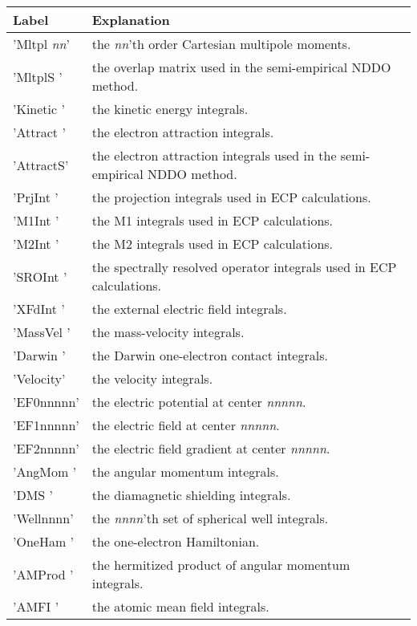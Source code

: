\begin{tabular}{ll}
\hline \hline
Label & Explanation \\
\hline
'Mltpl {\it nn}' & the {\it nn}'th order Cartesian multipole moments. \\
'MltplS  '       & the overlap matrix used in the semi-empirical NDDO method. \\
'Kinetic '       & the kinetic energy integrals. \\
'Attract '       & the electron attraction integrals. \\
'AttractS'       & the electron attraction integrals used in the semi-empirical NDDO method. \\
'PrjInt  '       & the projection integrals used in ECP calculations. \\
'M1Int   '       & the M1 integrals used in ECP calculations. \\
'M2Int   '       & the M2 integrals used in ECP calculations. \\
'SROInt  '       & the spectrally resolved operator integrals used in ECP calculations. \\
'XFdInt  '       & the external electric field integrals. \\
'MassVel '       & the mass-velocity integrals. \\
'Darwin  '       & the Darwin one-electron contact integrals. \\
'Velocity'       & the velocity integrals. \\
'EF0nnnnn'       & the electric potential at center {\it nnnnn}. \\
'EF1nnnnn'       & the electric field at center {\it nnnnn}. \\
'EF2nnnnn'       & the electric field gradient at center {\it nnnnn}. \\
'AngMom  '       & the angular momentum integrals. \\
'DMS     '       & the diamagnetic shielding integrals. \\
'Wellnnnn'       & the {\it nnnn}'th set of spherical well integrals. \\
'OneHam  '       & the one-electron Hamiltonian. \\
'AMProd  '       & the hermitized product of angular momentum integrals. \\
'AMFI    '       & the atomic mean field integrals. \\
\hline \hline
\end{tabular}




